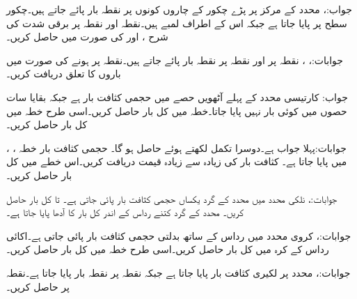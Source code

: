 جواب:، 
محدد کے مرکز پر پڑے چکور کے چاروں کونوں پر  نقطہ بار پائے جاتے ہیں۔چکور  سطح پر پایا جاتا ہے جبکہ اس کے اطراف  لمبے ہیں۔نقطہ  اور نقطہ  پر برقی شدت کی شرح ،  اور  کی صورت میں حاصل کریں۔

جوابات:، ، 
نقطہ  پر  اور نقطہ  پر  نقطہ بار پائے جاتے ہیں۔نقطہ  پر  ہونے کی صورت میں باروں کا تعلق دریافت کریں۔ 

جواب:
کارتیسی محدد کے پہلے آٹھویں حصے  میں حجمی کثافت بار  ہے جبکہ بقایا سات حصوں میں کوئی بار نہیں پایا جاتا۔خطہ  میں کل بار حاصل کریں۔اسی طرح خطہ  میں کل بار حاصل کریں۔

جوابات:پہلا جواب  ہے۔دوسرا تکمل  لکھتے ہوئے  حاصل ہو گا۔ 
حجمی کثافت بار  خطہ ، ،  میں پایا جاتا ہے۔ کثافت بار کی زیادہ سے زیادہ قیمت دریافت کریں۔اس خطے میں کل بار حاصل کریں۔

جوابات:، 
نلکی محدد میں  محدد کے گرد یکساں حجمی کثافت بار  پائی جاتی ہے۔ تا  کل بار حاصل کریں۔ محدد کے گرد کتنے رداس کے اندر کل بار کا آدھا پایا جاتا ہے۔

جوابات:،  
کروی محدد میں رداس کے ساتھ بدلتی حجمی کثافت بار  پائی جاتی ہے۔اکائی رداس کے کرہ میں کل بار حاصل کریں۔اسی طرح خطہ  میں کل بار حاصل کریں۔ 

جوابات:، 
 محدد پر  لکیری کثافت بار پایا جاتا ہے جبکہ نقطہ  پر  نقطہ بار پایا جاتا ہے۔نقطہ  پر  حاصل کریں۔


